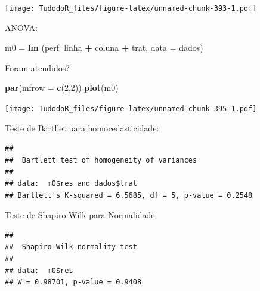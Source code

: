\documentclass[
]{book}
\newenvironment{Shaded}{\begin{snugshade}}{\end{snugshade}}
\newcommand{\DataTypeTok}[1]{\textcolor[rgb]{0.13,0.29,0.53}{#1}}
\newcommand{\DecValTok}[1]{\textcolor[rgb]{0.00,0.00,0.81}{#1}}
\newcommand{\KeywordTok}[1]{\textcolor[rgb]{0.13,0.29,0.53}{\textbf{#1}}}
\newcommand{\NormalTok}[1]{#1}
\newcommand{\OperatorTok}[1]{\textcolor[rgb]{0.81,0.36,0.00}{\textbf{#1}}}
\newcommand{\StringTok}[1]{\textcolor[rgb]{0.31,0.60,0.02}{#1}}
\begin{document}
\texttt{[image: TudodoR\_files/figure-latex/unnamed-chunk-393-1.pdf]}

ANOVA:

\begin{Shaded}
\begin{Highlighting}[]
\NormalTok{m0 =}\StringTok{ }\KeywordTok{lm}\NormalTok{ (perf}\OperatorTok{~}\NormalTok{linha }\OperatorTok{+}\StringTok{ }\NormalTok{coluna }\OperatorTok{+}\StringTok{ }\NormalTok{trat, }\DataTypeTok{data =}\NormalTok{ dados)}
\end{Highlighting}
\end{Shaded}

Foram atendidos?

\begin{Shaded}
\begin{Highlighting}[]
\KeywordTok{par}\NormalTok{(}\DataTypeTok{mfrow =} \KeywordTok{c}\NormalTok{(}\DecValTok{2}\NormalTok{,}\DecValTok{2}\NormalTok{)) }
\KeywordTok{plot}\NormalTok{(m0)}
\end{Highlighting}
\end{Shaded}

\texttt{[image: TudodoR\_files/figure-latex/unnamed-chunk-395-1.pdf]}

Teste de Bartllet para homocedasticidade:

\begin{Shaded}
\end{Shaded}

\begin{verbatim}
## 
##  Bartlett test of homogeneity of variances
## 
## data:  m0$res and dados$trat
## Bartlett's K-squared = 6.5685, df = 5, p-value = 0.2548
\end{verbatim}

Teste de Shapiro-Wilk para Normalidade:

\begin{Shaded}
\end{Shaded}

\begin{verbatim}
## 
##  Shapiro-Wilk normality test
## 
## data:  m0$res
## W = 0.98701, p-value = 0.9408
\end{verbatim}
\end{document}
